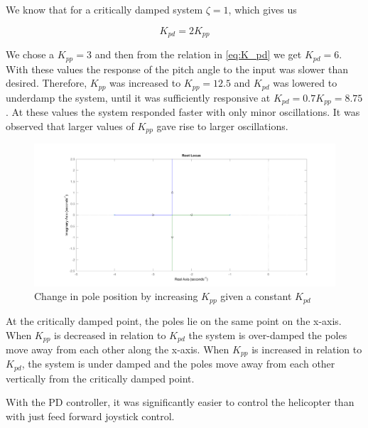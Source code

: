 We know that for a critically damped system $\zeta = 1$, which gives
us

\begin{equation}
  \label{eq:K_pd}
  K_{pd} = 2K_{pp}
\end{equation}

We chose a $K_{pp} = 3$ and then from the relation in \cref{eq:K_pd}
we get $K_{pd} = 6$. With these values the response of the pitch angle
to the input was slower than desired. Therefore, $K_{pp}$ was
increased to $K_{pp} = 12.5$ and $K_{pd}$ was lowered to underdamp the
system, until it  was sufficiently responsive at $K_{pd} = 0.7K_{pp} =
8.75$. At these values the system responded faster with only minor
oscillations. It was observed that larger values of $K_{pp}$ gave rise
to larger oscillations.

\begin{figure}[H]
  \caption{Change in pole position by increasing $K_{pp}$ given a constant $K_{pd}$}
  \label{fig:root_locus}
  \includegraphics[width=\textwidth]{images/root_locus}
\end{figure}

At the critically damped point, the poles lie on the same point on
the x-axis. When $K_{pp}$ is decreased in relation to $K_{pd}$ the system is
over-damped the poles move away from each other along the x-axis.
When $K_{pp}$ is increased in relation to $K_{pd}$, the system is under damped
and the poles move away from each other vertically from the critically
damped point.

With the PD controller, it was significantly easier to control the
helicopter than with just feed forward joystick control.


